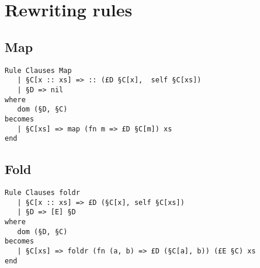 \chapter{Rewriting rules}

\section{Map}


\begin{verbatim}
Rule Clauses Map
   | §C[x :: xs] => :: (£D §C[x],  self §C[xs])
   | §D => nil
where
   dom (§D, §C)
becomes
   | §C[xs] => map (fn m => £D §C[m]) xs
end
\end{verbatim}


\section{Fold}

\begin{verbatim}
Rule Clauses foldr
   | §C[x :: xs] => £D (§C[x], self §C[xs])
   | §D => [E] §D
where
   dom (§D, §C)
becomes
   | §C[xs] => foldr (fn (a, b) => £D (§C[a], b)) (£E §C) xs
end
\end{verbatim}

